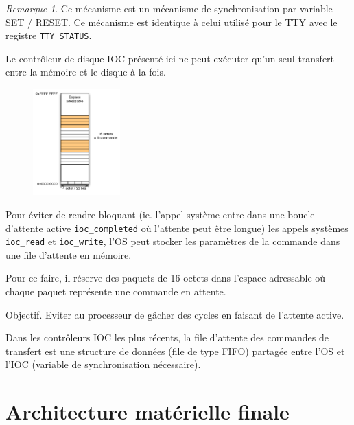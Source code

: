 \documentclass[11pt,english,french]{scrreprt}
\theoremstyle{remark}
\newtheorem*{rem*}{Remarque}
\theoremstyle{definition}
\begin{document}
\begin{rem*}
	Ce mécanisme est un mécanisme de synchronisation par variable SET / RESET.
	Ce mécanisme est identique à celui utilisé pour le TTY avec le registre \lstinline!TTY_STATUS!.
\end{rem*}

Le contrôleur de disque IOC présenté ici ne peut exécuter qu'un seul transfert entre la mémoire et le disque à la fois. 

\begin{figure}
	\vspace{-15pt}
	\begin{center}
		\includegraphics[width=0.30\textwidth]{diagrammes/file_attente}
		\vspace{-15pt}
	\end{center}
	
\end{figure}

Pour éviter de rendre bloquant (ie. l'appel système entre dans une boucle d'attente active \lstinline!ioc_completed! où l'attente peut être longue) les appels systèmes \lstinline!ioc_read! et \lstinline!ioc_write!, l'OS peut stocker les paramètres de la commande dans une file d'attente en mémoire.

Pour ce faire, il réserve des paquets de 16 octets dans l'espace adressable où chaque paquet représente une commande en attente.

Objectif. Eviter au processeur de gâcher des cycles en faisant de l'attente active.

Dans les contrôleurs IOC les plus récents, la file d'attente des commandes de transfert est une structure de données (file de type FIFO) partagée entre l'OS et l'IOC (variable de synchronisation nécessaire).

\clearpage
\section{Architecture matérielle finale} %
\end{document}
